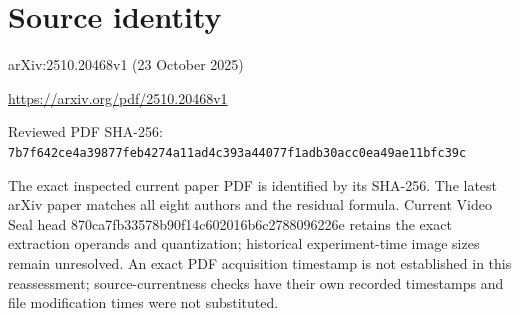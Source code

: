 \documentclass[11pt]{article}
\begin{document}
\section*{Source identity}

arXiv:2510.20468v1 (23 October 2025)

\url{https://arxiv.org/pdf/2510.20468v1}

Reviewed PDF SHA-256: \nolinkurl{7b7f642ce4a39877feb4274a11ad4c393a44077f1adb30acc0ea49ae11bfc39c}

The exact inspected current paper PDF is identified by its SHA-256. The latest arXiv paper matches all eight authors and the residual formula. Current Video Seal head 870ca7fb33578b90f14c602016b6c2788096226e retains the exact extraction operands and quantization; historical experiment-time image sizes remain unresolved. An exact PDF acquisition timestamp is not established in this reassessment; source-currentness checks have their own recorded timestamps and file modification times were not substituted.
\end{document}
